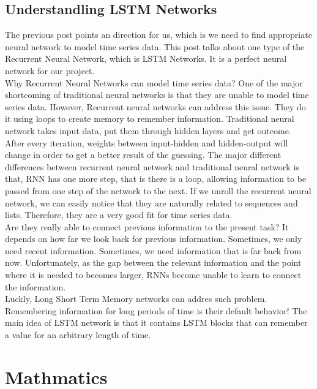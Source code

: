 \documentclass[prodmode,acmtecs]{acmsmall} %
\begin{document}
\subsection{Understandling LSTM Networks}
The previous post points an direction for us, which is we need to find appropriate neural network to model time series data. This post talks about one type of the Recurrent Neural Network, which is LSTM Networks. It is a perfect neural network for our project. \\
Why Recurrent Neural Networks can model time series data? One of the major shortcoming of traditional neural networks is that they are unable to model time series data. However, Recurrent neural networks can address this issue. They do it using loops to create memory to remember information. Traditional neural network takes input data, put them through hidden layers and get outcome. After every iteration, weights between input-hidden and hidden-output will change in order to get a better result of the guessing. The major different differences between recurrent neural network and traditional neural network is that, RNN has one more step, that is there is a loop, allowing information to be passed from one step of the network to the next. If we unroll the recurrent neural network, we can easily notice that they are naturally related to sequences and lists. Therefore, they are a very good fit for time series data.\\
Are they really able to connect previous information to the present task? It depends on how far we look back for previous information. Sometimes, we only need recent information. Sometimes, we need information that is far back from now. Unfortunately, as the gap between the relevant information and the point where it is needed to becomes larger, RNNs become unable to learn to connect the information.\\
Luckly, Long Short Term Memory networks can addres such problem. Remembering information for long periods of time is their default behavior! The main idea of LSTM network is that it contains LSTM blocks that can remember a value for an arbitrary length of time.

\section{Mathmatics}
\label{sec:sim}
\end{document}
